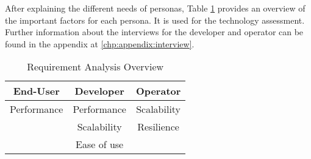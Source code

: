 After explaining the different needs of personas, Table \ref{tab:requirementsAnalysis} provides an overview of the important factors for each persona. It is used for the technology assessment.
Further information about the interviews for the developer and operator can be found in the appendix at \ref{chp:appendix:interview}.

\begin{table}
	\centering
	\begin{tabular}{ |c|c|c| }
		\hline
		End-User    & Developer   & Operator    \\
		\hline
		Performance & Performance & Scalability \\
		            & Scalability & Resilience  \\
		            & Ease of use &             \\
		\hline
	\end{tabular}
	\caption{Requirement Analysis Overview} \label{tab:requirementsAnalysis}
\end{table}